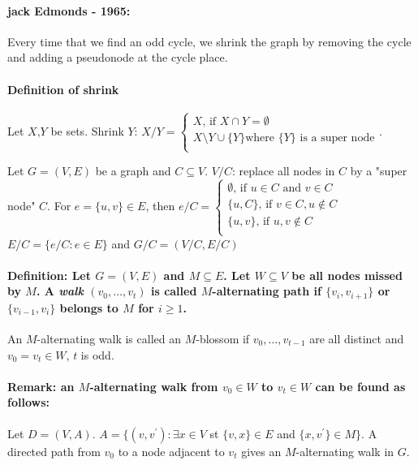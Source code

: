 \documentclass[main]{subfiles}
\begin{document}
\paragraph{jack Edmonds - 1965:} Every time that we find an odd cycle, we
shrink the graph by removing the cycle and adding a pseudonode at the cycle
place.

\paragraph{Definition of shrink} Let $X$,$Y$ be sets.
Shrink $Y$: $X/Y =
\begin{cases}
  X\text{, if } X \cap Y = \emptyset\\
  X \setminus Y \cup \{Y\} \text{where $\{Y\}$ is a super node} \\
\end{cases}$.

Let $G=(V,E)$ be a graph and $C \subseteq V$. $V/C$: replace all nodes in $C$
by a "super node" $C$.
For $e =\{u,v\} \in E$, then $e/C =
\begin{cases}
  \emptyset \text{, if } u \in C \text{ and } v \in C \\
  \{u,C\} \text{, if } v \in C, u \notin C \\
  \{u,v\} \text{, if } u,v \notin C\\
\end{cases}$\\
$E/C = \{ e/C: e \in E\}$ and $G/C = (V/C, E/C)$

\paragraph{Definition: Let $G=(V,E)$ and $M \subseteq E$. Let $W \subseteq V$
be all nodes missed by $M$. A \emph{walk} $(v_0, \dots, v_t)$ is called
$M$-alternating path if $\{v_i, v_{i+1}\}$ or $\{v_{i-1}, v_i\}$ belongs to
$M$ for $i \geq 1$.}

An $M$-alternating walk is called an $M$-blossom if $v_0, \dots, v_{t-1}$ are
all distinct and $v_0 = v_t \in W$, $t$ is odd.

\paragraph{Remark: an $M$-alternating walk from $v_0 \in W$ to $v_t \in W$ can
be found as follows:}
Let $D=(V,A)$. $A=\{(v,v^\prime): \exists x \in V$ st $\{v,x\} \in E$ and
$\{x,v^\prime\} \in M\}$. A directed path from $v_0$ to a node adjacent to
$v_t$ gives an $M$-alternating walk in $G$.
\end{document}
